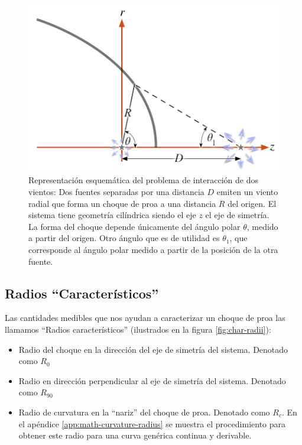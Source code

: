 \begin{figure}
  \includegraphics[width=0.5\linewidth]{./Figures/bowshock-crw-variables}
  \caption{Representación esquemática del problema de interacción de dos vientos:
    Dos fuentes separadas por una distancia $D$ emiten un viento radial que forma un
    choque de proa a una distancia $R$ del origen. El sistema tiene geometría cilíndrica
    siendo el eje $z$ el eje de simetría. La forma del choque depende únicamente del ángulo
    polar $\theta$, medido a partir del origen. Otro ángulo que es de utilidad es $\theta_1$,
    que corresponde al ángulo polar medido a partir de la posición de la otra fuente.}
    \label{fig:crw-esquema}
\end{figure}

\subsection{Radios ``Característicos''}
\label{sec:char-rad}
Las cantidades medibles que nos ayudan a caracterizar un choque de proa las
llamamos ``Radios característicos'' (ilustrados en la figura
\ref{fig:char-radii}):
\begin{itemize}
\item Radio del choque en la dirección del eje de simetría del sistema.
  Denotado como $R_0$
\item Radio en dirección perpendicular al eje de simetría del sistema.
  Denotado como $R_{90}$
\item Radio de curvatura en la ``nariz'' del choque de proa. Denotado
  como $R_c$. En el apéndice \ref{app:math-curvature-radius} se muestra
  el procedimiento para obtener este radio para una curva genérica continua
  y derivable.
\end{itemize}

